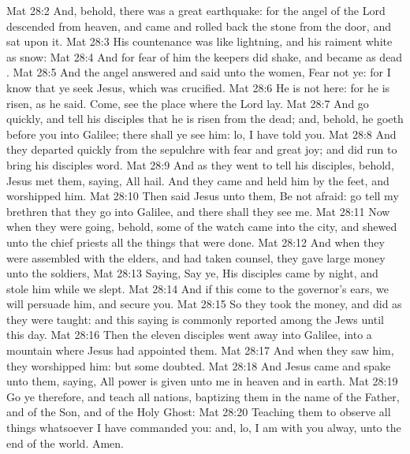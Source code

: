 \vs Mat 28:2 And, behold, there was a great earthquake: for the angel of the Lord descended from heaven, and came and rolled back the stone from the door, and sat upon it.
\vs Mat 28:3 His countenance was like lightning, and his raiment white as snow:
\vs Mat 28:4 And for fear of him the keepers did shake, and became as dead .
\vs Mat 28:5 And the angel answered and said unto the women, Fear not ye: for I know that ye seek Jesus, which was crucified.
\vs Mat 28:6 He is not here: for he is risen, as he said. Come, see the place where the Lord lay.
\vs Mat 28:7 And go quickly, and tell his disciples that he is risen from the dead; and, behold, he goeth before you into Galilee; there shall ye see him: lo, I have told you.
\vs Mat 28:8 And they departed quickly from the sepulchre with fear and great joy; and did run to bring his disciples word.
\vs Mat 28:9 And as they went to tell his disciples, behold, Jesus met them, saying, All hail. And they came and held him by the feet, and worshipped him.
\vs Mat 28:10 Then said Jesus unto them, Be not afraid: go tell my brethren that they go into Galilee, and there shall they see me.
\vs Mat 28:11 Now when they were going, behold, some of the watch came into the city, and shewed unto the chief priests all the things that were done.
\vs Mat 28:12 And when they were assembled with the elders, and had taken counsel, they gave large money unto the soldiers,
\vs Mat 28:13 Saying, Say ye, His disciples came by night, and stole him  while we slept.
\vs Mat 28:14 And if this come to the governor's ears, we will persuade him, and secure you.
\vs Mat 28:15 So they took the money, and did as they were taught: and this saying is commonly reported among the Jews until this day.
\vs Mat 28:16 Then the eleven disciples went away into Galilee, into a mountain where Jesus had appointed them.
\vs Mat 28:17 And when they saw him, they worshipped him: but some doubted.
\vs Mat 28:18 And Jesus came and spake unto them, saying, All power is given unto me in heaven and in earth.
\vs Mat 28:19 Go ye therefore, and teach all nations, baptizing them in the name of the Father, and of the Son, and of the Holy Ghost:
\vs Mat 28:20 Teaching them to observe all things whatsoever I have commanded you: and, lo, I am with you alway,  unto the end of the world. Amen.

